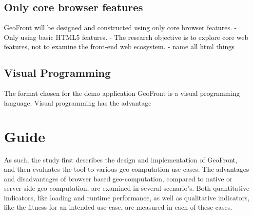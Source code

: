 \subsection*{ Only core browser features }
GeoFront will be designed and constructed using only core browser features. 
- Only using basic HTML5 features.
- The research objective is to explore core web features, not to examine the front-end web ecosystem. 
- name all html things

\subsection*{ Visual Programming }
The format chosen for the demo application GeoFront is a visual programming language. Visual programming has the advantage 

\section{Guide}

As such, the study first describes the design and implementation of GeoFront, and then evaluates the tool to various geo-computation use cases.
The advantages and disadvantages of browser based geo-computation, compared to native or server-side geo-computation, are examined in several scenario's. 
Both quantitative indicators, like loading and runtime performance, as well as qualitative indicators, like the fitness for an intended use-case, are measured in each of these cases.